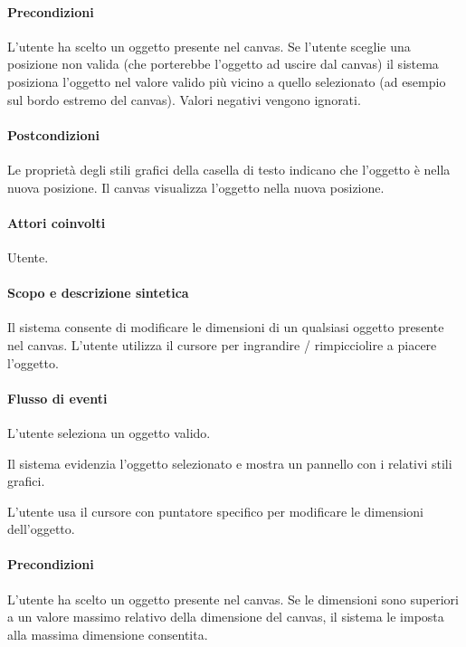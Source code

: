 \paragraph{Precondizioni} L'utente ha scelto un oggetto  presente nel canvas. Se l'utente sceglie una posizione non valida (che porterebbe l'oggetto ad uscire dal canvas) il sistema posiziona l'oggetto nel valore valido pi\` u vicino a quello selezionato (ad esempio sul bordo estremo del canvas). Valori negativi vengono ignorati.
\paragraph{Postcondizioni} Le propriet\`  a degli stili grafici della casella di testo indicano che l'oggetto \`e nella nuova posizione. Il canvas visualizza l'oggetto nella nuova posizione.

\paragraph{Attori coinvolti} Utente.
\paragraph{Scopo e descrizione sintetica}  Il sistema consente di modificare le dimensioni  di un qualsiasi oggetto presente nel canvas.  L'utente utilizza il cursore per ingrandire / rimpicciolire a piacere l'oggetto.
\paragraph{Flusso di eventi}
\begin{elenconumerato}[\textbf{}]{\subsubsecindent}
\item  L'utente seleziona un oggetto valido.
\item  Il sistema evidenzia l'oggetto selezionato e mostra un pannello con i relativi stili grafici.
\item  L'utente usa il cursore con puntatore specifico per modificare le dimensioni dell'oggetto.
\end{elenconumerato}
\paragraph{Precondizioni} L'utente ha scelto un oggetto presente nel canvas. Se le dimensioni sono superiori a un valore massimo relativo della dimensione del canvas, il sistema le imposta alla massima dimensione consentita.
